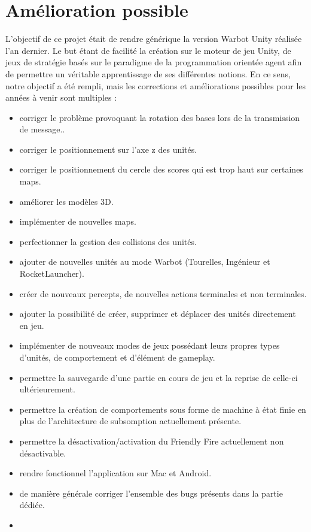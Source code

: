\documentclass{report}
\begin{document}
\section{Amélioration possible}
L’objectif de ce projet était de rendre générique la version Warbot Unity réalisée l'an dernier.
Le but étant de facilité la création sur le moteur de jeu Unity, de jeux de stratégie basés sur le paradigme de  la programmation orientée agent afin de permettre un véritable apprentissage de ses différentes notions. En ce sens, notre objectif a été rempli, mais les corrections et améliorations possibles pour les années à
venir sont multiples :
\begin{itemize}
\item corriger le problème provoquant la rotation des bases lors de la transmission de message..
\item corriger le positionnement sur l'axe z des unités.
\item corriger le positionnement du cercle des scores qui est trop haut sur certaines maps. 
\item améliorer les modèles 3D.
\item implémenter de nouvelles maps.
\item perfectionner la gestion des collisions des unités.
\item ajouter de nouvelles unités au mode Warbot (Tourelles, Ingénieur et RocketLauncher).
\item créer de nouveaux percepts, de nouvelles actions terminales et non terminales.
\item ajouter la possibilité de créer, supprimer et déplacer des unités directement en jeu.
\item implémenter de nouveaux modes de jeux possédant leurs propres types d'unités, de comportement et d'élément de gameplay.
\item permettre la sauvegarde d'une partie en cours de jeu et la reprise de celle-ci ultérieurement.
\item permettre la création de comportements sous forme de machine à état finie en plus de l'architecture de subsomption actuellement présente.
\item permettre la désactivation/activation du Friendly Fire actuellement non désactivable.
\item rendre fonctionnel l'application sur Mac et Android.
\item de manière générale corriger l'ensemble des bugs présents dans la partie dédiée.
\item
\end{itemize}
\end{document}
